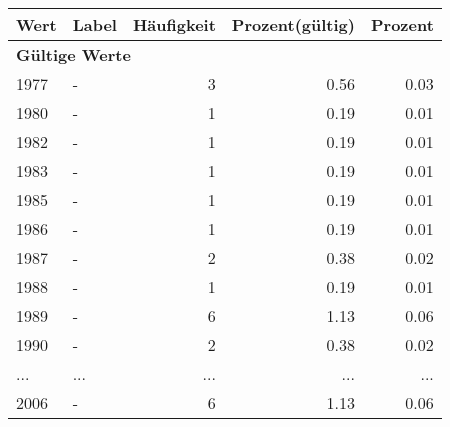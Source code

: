      \begin{longtable}{lXrrr}
     \toprule
     \textbf{Wert} & \textbf{Label} & \textbf{Häufigkeit} & \textbf{Prozent(gültig)} & \textbf{Prozent} \\
     \endhead
     \midrule
     \multicolumn{5}{l}{\textbf{Gültige Werte}}\\
        1977 & \multicolumn{1}{X}{-} & %
          \num{3} &
          \num[round-mode=places,round-precision=2]{0.56} &
          \num[round-mode=places,round-precision=2]{0.03} \\
        1980 & \multicolumn{1}{X}{-} & %
          \num{1} &
          \num[round-mode=places,round-precision=2]{0.19} &
          \num[round-mode=places,round-precision=2]{0.01} \\
        1982 & \multicolumn{1}{X}{-} & %
          \num{1} &
          \num[round-mode=places,round-precision=2]{0.19} &
          \num[round-mode=places,round-precision=2]{0.01} \\
        1983 & \multicolumn{1}{X}{-} & %
          \num{1} &
          \num[round-mode=places,round-precision=2]{0.19} &
          \num[round-mode=places,round-precision=2]{0.01} \\
        1985 & \multicolumn{1}{X}{-} & %
          \num{1} &
          \num[round-mode=places,round-precision=2]{0.19} &
          \num[round-mode=places,round-precision=2]{0.01} \\
        1986 & \multicolumn{1}{X}{-} & %
          \num{1} &
          \num[round-mode=places,round-precision=2]{0.19} &
          \num[round-mode=places,round-precision=2]{0.01} \\
        1987 & \multicolumn{1}{X}{-} & %
          \num{2} &
          \num[round-mode=places,round-precision=2]{0.38} &
          \num[round-mode=places,round-precision=2]{0.02} \\
        1988 & \multicolumn{1}{X}{-} & %
          \num{1} &
          \num[round-mode=places,round-precision=2]{0.19} &
          \num[round-mode=places,round-precision=2]{0.01} \\
        1989 & \multicolumn{1}{X}{-} & %
          \num{6} &
          \num[round-mode=places,round-precision=2]{1.13} &
          \num[round-mode=places,round-precision=2]{0.06} \\
        1990 & \multicolumn{1}{X}{-} & %
          \num{2} &
          \num[round-mode=places,round-precision=2]{0.38} &
          \num[round-mode=places,round-precision=2]{0.02} \\
       ... & ... & ... & ... & ... \\
        2006 & \multicolumn{1}{X}{-} & %
          \num{6} &
          \num[round-mode=places,round-precision=2]{1.13} &
          \num[round-mode=places,round-precision=2]{0.06} \\


\end{longtable}
